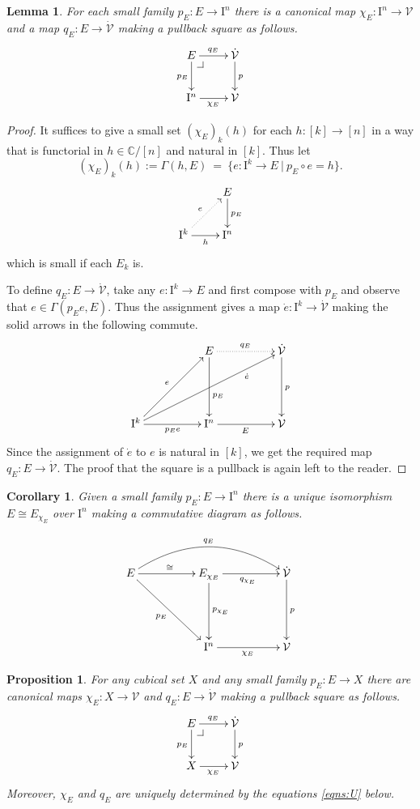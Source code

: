 \documentclass[11pt]{article}
\makeatletter
\newcommand{\C}{\ensuremath{\mathbb{C}}}
\newcommand{\pbcorner}[1][dr]{\save*!/#1-1.2pc/#1:(-1,1)@^{|-}\restore}
\newcommand{\ra}{\ensuremath{\rightarrow}}
\newcommand{\I}{\ensuremath{\mathrm{I}}}
\newcommand{\V}{\ensuremath{\mathcal{V}}}
\newcommand{\VV}{\ensuremath{\dot{\mathcal{V}}}}
\newtheorem{proposition}[theorem]{Proposition}
\newtheorem{lemma}[theorem]{Lemma}
\newtheorem{corollary}[theorem]{Corollary}
\theoremstyle{remark}
\theoremstyle{definition}
\makeatother
\begin{document}
\begin{lemma}\label{charforfamovercube}
For each small family $p_E : E \ra \I^n$ there is a canonical map $\chi_E : \I^n \ra \V$ and a map $q_E:E \ra\VV$ making a pullback square as follows.
\begin{equation}\label{diagram:U2}
\xymatrix{
E \ar[d]_{p_E} \ar[r]^{q_E}  \pbcorner& \VV\ar[d]^{p}  \\
\I^n \ar[r]_{\chi_E} & \V
}
\end{equation}
\end{lemma}
%
\begin{proof}
It suffices to give a small set $(\chi_E)_k(h)$ for each $h :[k] \ra [n]$ in a way that is functorial in $h \in \C/[n]$ and natural in $[k]$.  Thus let
\[
(\chi_E)_k(h) := \Gamma(h, E)\ = \ \{ e : \I^k \ra E \ |\ p_E\circ e = h \}.
\]
\[
\xymatrix{& E \ar[d]^{p_E} \\ \I^k \ar@{..>}[ru]^{e}\ar[r]_h & \I^n } 
\]
which is small if each $E_k$ is.  

To define $q_E:E \ra\VV$,  take any $e : \I^k \ra E$ and first compose with $p_E$ and observe that $e \in  \Gamma(p_Ee, E)$.  Thus the assignment gives a map $\dot{e} : \I^k \ra \VV$ making the solid arrows in the following commute.
\begin{equation}\label{diagram:U4}
\xymatrix@=5em{
&E \ar[d]^>>>>>>>{p_E} \ar@{..>}[r]^{q_E} & \VV\ar[d]^{p}  \\
\I^k \ar[r]_{p_Ee} \ar[ru]^{e}\ar[rru]_>>>>>>>>>>>{\dot{e}} & \I^n \ar[r]_{E} & \V
}
\end{equation}
Since the assignment of $\dot{e}$ to $e$ is natural in $[k]$, we get the required map $q_E : E\ra \VV$.
The proof that the square is a pullback is again left to the reader.
\end{proof}

\begin{corollary}
Given a small family $p_E : E \ra \I^n$ there is a unique isomorphism $E \cong E_{\chi_E}$ over $\I^n$ making a commutative diagram as follows.

\begin{equation}\label{diagram:U5}
\xymatrix@=5em{
E \ar[rd]_{p_E} \ar@/^2.0pc/[rr]^{q_E} \ar[r]^{\cong}  & E_{\chi_E} \ar[d]^{p_{\chi_E}} \ar[r]_{q_{\chi_E}} & \VV \ar[d]^{p}  \\
 &\I^n \ar[r]_{\chi_E} & \V
}
\end{equation}
\end{corollary}
%

\begin{proposition}\label{prop:familyclassifier}
For any cubical set $X$ and any small family $p_E : E \ra X$ there are canonical maps $\chi_E : X \ra \V$ and $q_E : E \ra\VV$ making a pullback square as follows.
\begin{equation}\label{diagram:U6}
\xymatrix{
E \ar[d]_{p_E} \ar[r]^{q_E}  \pbcorner & \VV\ar[d]^{p}  \\
X \ar[r]_{\chi_E} & \V
}
\end{equation}
Moreover, $\chi_E$ and $q_E$ are uniquely determined by the equations \eqref{eqns:U} below.
\end{proposition}
\end{document}
